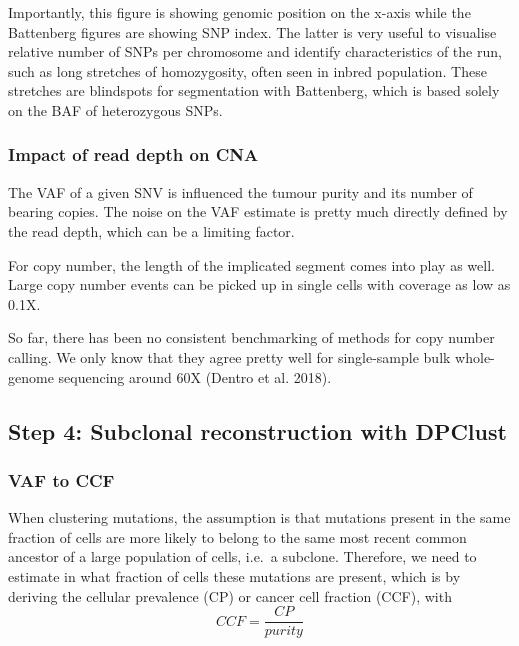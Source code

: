 \documentclass[]{article}
\begin{document}
Importantly, this figure is showing genomic position on the x-axis while
the Battenberg figures are showing SNP index. The latter is very useful
to visualise relative number of SNPs per chromosome and identify
characteristics of the run, such as long stretches of homozygosity,
often seen in inbred population. These stretches are blindspots for
segmentation with Battenberg, which is based solely on the BAF of
heterozygous SNPs.

\hypertarget{impact-of-read-depth-on-cna}{%
\subsubsection{Impact of read depth on
CNA}\label{impact-of-read-depth-on-cna}}

The VAF of a given SNV is influenced the tumour purity and its number of
bearing copies. The noise on the VAF estimate is pretty much directly
defined by the read depth, which can be a limiting factor.

For copy number, the length of the implicated segment comes into play as
well. Large copy number events can be picked up in single cells with
coverage as low as 0.1X.

So far, there has been no consistent benchmarking of methods for copy
number calling. We only know that they agree pretty well for
single-sample bulk whole-genome sequencing around 60X (Dentro et al.
2018).

\newpage

\hypertarget{step-4-subclonal-reconstruction-with-dpclust}{%
\subsection{Step 4: Subclonal reconstruction with
DPClust}\label{step-4-subclonal-reconstruction-with-dpclust}}

\hypertarget{vaf-to-ccf}{%
\subsubsection{VAF to CCF}\label{vaf-to-ccf}}

When clustering mutations, the assumption is that mutations present in
the same fraction of cells are more likely to belong to the same most
recent common ancestor of a large population of cells, i.e.~a subclone.
Therefore, we need to estimate in what fraction of cells these mutations
are present, which is by deriving the cellular prevalence (CP) or cancer
cell fraction (CCF), with \[CCF=\frac{CP}{purity}\]
\end{document}
